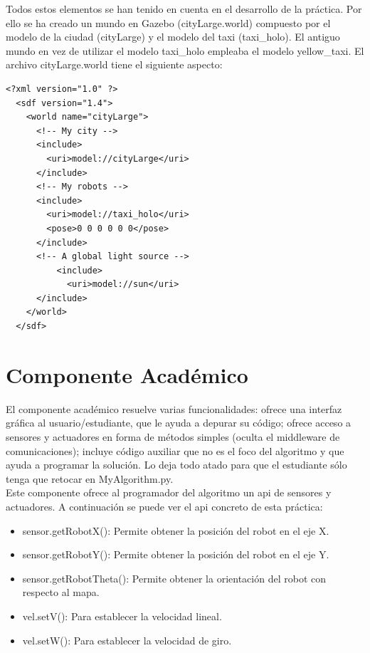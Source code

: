 Todos estos elementos se han tenido en cuenta en el desarrollo de la práctica. Por ello se ha creado un mundo en Gazebo (cityLarge.world) compuesto por el modelo de la ciudad (cityLarge) y el modelo del taxi (taxi\_holo). El antiguo mundo en vez de utilizar el modelo taxi\_holo empleaba el modelo yellow\_taxi. El archivo cityLarge.world tiene el siguiente aspecto:

\vspace{20pt}
	\begin{lstlisting}[frame=single]
<?xml version="1.0" ?>
  <sdf version="1.4">
    <world name="cityLarge">
      <!-- My city -->
      <include>
        <uri>model://cityLarge</uri>
      </include>
      <!-- My robots -->
      <include>
        <uri>model://taxi_holo</uri>
        <pose>0 0 0 0 0 0</pose>
      </include>
      <!-- A global light source -->
          <include>
            <uri>model://sun</uri>
      </include>
    </world>
  </sdf>

	\end{lstlisting}

\section{Componente Académico}
El componente académico resuelve varias funcionalidades: ofrece una interfaz gráfica al usuario/estudiante, que le ayuda a depurar su código; ofrece acceso a sensores y actuadores en forma de métodos simples (oculta el middleware de comunicaciones); incluye código auxiliar que no es el foco del algoritmo y que ayuda a programar la solución. Lo deja todo atado para que el estudiante sólo tenga que retocar en MyAlgorithm.py.\\

Este componente ofrece al programador del algoritmo un \acrfull{api} de sensores y actuadores. A continuación se puede ver el \acrshort{api} concreto de esta práctica:

\begin{itemize}
\item sensor.getRobotX(): Permite obtener la posición del robot en el eje X.
\item sensor.getRobotY(): Permite obtener la posición del robot en el eje Y.
\item sensor.getRobotTheta(): Permite obtener la orientación del robot con respecto al mapa.
\item vel.setV(): Para establecer la velocidad lineal.
\item vel.setW(): Para establecer la velocidad de giro.
\end{itemize}

